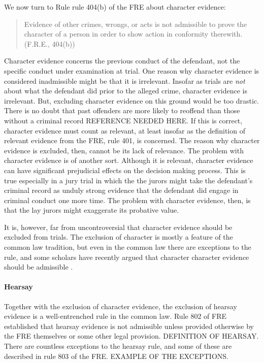 \documentclass[10pt]{article}
\begin{document}
We now turn to Rule rule 404(b) of the FRE about character evidence:
%
\begin{quote}
\begin{singlespace}
Evidence of other crimes, wrongs, or acts is not admissible to prove 
the character of a person in order to show action in conformity therewith.
(F.R.E., 404(b))
\end{singlespace}
\end{quote}
%
Character evidence concerns the previous conduct of the defendant, not the specific conduct 
under examination at trial. One reason why character evidence is considered inadmissible might be  
that it is irrelevant. Insofar as trials are \textit{not} about what the defendant did prior to the alleged crime, character evidence is irrelevant. But, excluding character 
evidence on this ground would be too drastic. There is no doubt that past offenders are more likely to reoffend than those without a criminal record REFERENCE NEEDED HERE. If this is correct, 
character evidence must count as relevant, at least insofar as the definition of relevant evidence from the FRE, rule 401, is concerned. The reason why character evidence is excluded, then, cannot be its lack of relevance. The problem with character evidence is of another sort. Although it is relevant, character evidence can have significant 
prejudicial effects on the decision making process. This is true especially in a jury trial in which the the jurors might take 
the defendant's criminal record as unduly strong evidence that the defendant did engage in criminal conduct one more time. The problem with character 
evidence, then, is that the lay jurors might exaggerate its probative value. 

It is, however, far from uncontroversial that character evidence should be excluded from trials. The exclusion of character 
is mostly a feature of the common law tradition, but even in the common law there are exceptions to the rule, %
and some scholars have recently argued that character character evidence should be admissible \citep{redmayne02}.

\paragraph{Hearsay} Together with the exclusion of character evidence, the exclusion of hearsay evidence is a well-entrenched rule in the common law. Rule 802 of FRE established that hearsay evidence is 
not admissible unless provided otherwise by the FRE themselves or some other legal provision. DEFINITION OF HEARSAY. There are countless exceptions to the hearsay rule, and some of these are described in rule 803 of the FRE. EXAMPLE OF THE EXCEPTIONS. 
\end{document}
